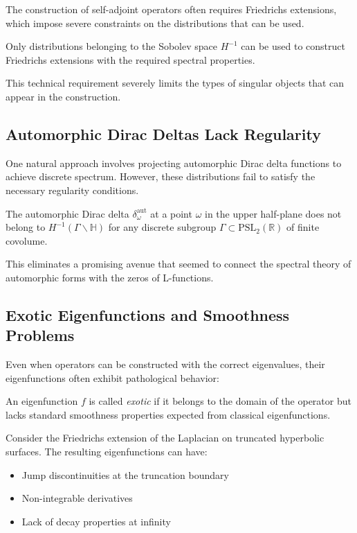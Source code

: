 The construction of self-adjoint operators often requires Friedrichs extensions, which impose severe constraints on the distributions that can be used.

\begin{theorem}[H$^{-1}$ Requirement]
\label{thm:h_minus_one}
Only distributions belonging to the Sobolev space $H^{-1}$ can be used to construct Friedrichs extensions with the required spectral properties.
\end{theorem}

This technical requirement severely limits the types of singular objects that can appear in the construction.

\subsection{Automorphic Dirac Deltas Lack Regularity}

One natural approach involves projecting automorphic Dirac delta functions to achieve discrete spectrum. However, these distributions fail to satisfy the necessary regularity conditions.

\begin{proposition}
\label{prop:regularity_failure}
The automorphic Dirac delta $\delta_\omega^{\text{aut}}$ at a point $\omega$ in the upper half-plane does not belong to $H^{-1}(\Gamma \backslash \mathbb{H})$ for any discrete subgroup $\Gamma \subset \text{PSL}_2(\mathbb{R})$ of finite covolume.
\end{proposition}

This eliminates a promising avenue that seemed to connect the spectral theory of automorphic forms with the zeros of L-functions.

\subsection{Exotic Eigenfunctions and Smoothness Problems}

Even when operators can be constructed with the correct eigenvalues, their eigenfunctions often exhibit pathological behavior:

\begin{definition}
An eigenfunction $f$ is called \emph{exotic} if it belongs to the domain of the operator but lacks standard smoothness properties expected from classical eigenfunctions.
\end{definition}

\begin{example}
Consider the Friedrichs extension of the Laplacian on truncated hyperbolic surfaces. The resulting eigenfunctions can have:
\begin{itemize}
\item Jump discontinuities at the truncation boundary
\item Non-integrable derivatives
\item Lack of decay properties at infinity
\end{itemize}
\end{example}

